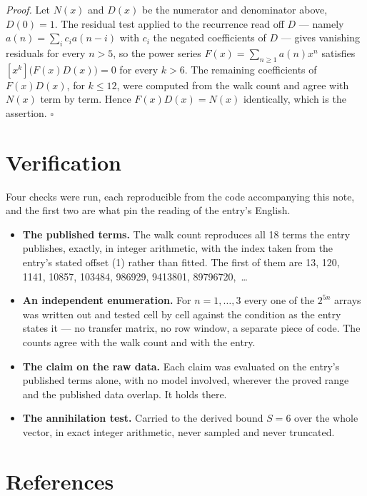 \documentclass[11pt]{article}
\theoremstyle{definition}
\begin{document}
{\itshape Proof.} Let $N(x)$ and $D(x)$ be the numerator and denominator above, $D(0)=1$. The residual test applied to the recurrence read off $D$ --- namely $a(n) = \sum_i c_i a(n-i)$ with $c_i$ the negated coefficients of $D$ --- gives vanishing residuals for every $n > 5$, so the power series $F(x)=\sum_{n\ge 1}a(n)x^n$ satisfies $[x^k]\bigl(F(x)D(x)\bigr) = 0$ for every $k > 6$. The remaining coefficients of $F(x)D(x)$, for $k \le 12$, were computed from the walk count and agree with $N(x)$ term by term. Hence $F(x)D(x) = N(x)$ identically, which is the assertion. $\square$

\section{Verification}

Four checks were run, each reproducible from the code accompanying this note, and the first two are what pin the reading of the entry's English.

\begin{itemize}

\item {\bfseries The published terms.} The walk count reproduces all 18 terms the entry publishes, exactly, in integer arithmetic, with the index taken from the entry's stated offset (1) rather than fitted. The first of them are 13, 120, 1141, 10857, 103484, 986929, 9413801, 89796720,~\dots

\item {\bfseries An independent enumeration.} For $n = 1,\dots,3$ every one of the $2^{5n}$ arrays was written out and tested cell by cell against the condition as the entry states it --- no transfer matrix, no row window, a separate piece of code. The counts agree with the walk count and with the entry.

\item {\bfseries The claim on the raw data.} Each claim was evaluated on the entry's published terms alone, with no model involved, wherever the proved range and the published data overlap. It holds there.

\item {\bfseries The annihilation test.} Carried to the derived bound $S = 6$ over the whole vector, in exact integer arithmetic, never sampled and never truncated.

\end{itemize}

\section{References}
\end{document}
